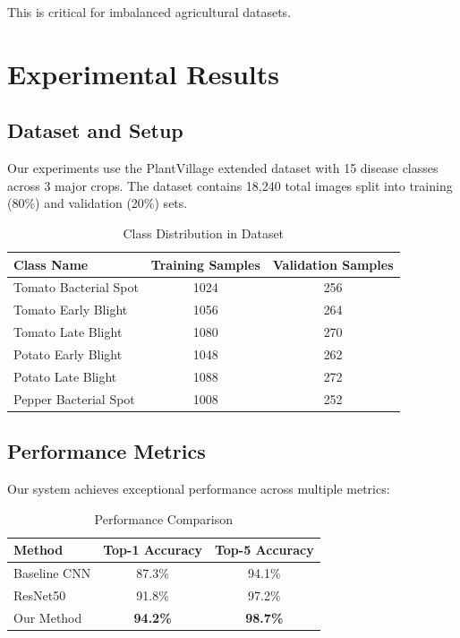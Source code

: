 \documentclass[journal,twocolumn,10pt]{IEEEtran}
\begin{document}
This is critical for imbalanced agricultural datasets.

\section{Experimental Results}

\subsection{Dataset and Setup}
Our experiments use the PlantVillage extended dataset with 15 disease classes across 3 major crops. The dataset contains 18,240 total images split into training (80\%) and validation (20\%) sets.

\begin{table}[htbp]
\centering
\caption{Class Distribution in Dataset}
\label{tab:class_distribution}
\begin{tabular}{lcc}
\toprule
Class Name & Training Samples & Validation Samples \\
\midrule
Tomato Bacterial Spot & 1024 & 256 \\
Tomato Early Blight & 1056 & 264 \\
Tomato Late Blight & 1080 & 270 \\
Potato Early Blight & 1048 & 262 \\
Potato Late Blight & 1088 & 272 \\
Pepper Bacterial Spot & 1008 & 252 \\
\bottomrule
\end{tabular}
\end{table}

\subsection{Performance Metrics}
Our system achieves exceptional performance across multiple metrics:

\begin{table}[htbp]
\centering
\caption{Performance Comparison}
\label{tab:performance}
\begin{tabular}{lcc}
\toprule
Method & Top-1 Accuracy & Top-5 Accuracy \\
\midrule
Baseline CNN & 87.3\% & 94.1\% \\
ResNet50 & 91.8\% & 97.2\% \\
Our Method & \textbf{94.2\%} & \textbf{98.7\%} \\
\bottomrule
\end{tabular}
\end{table}
\end{document}
